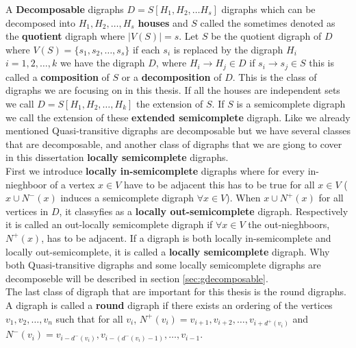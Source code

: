 A \textbf{Decomposable} digraphs $D=S[H_1,H_2,\dots H_s]$ digraphs which can be decomposed into $H_1,H_2, \dots , H_s$ \textbf{houses} and $S$ called the sometimes denoted as the \textbf{quotient} digraph where $|V(S)|=s$. 
Let $S$ be the quotient digraph of $D$ where $V(S)=\lbrace s_1,s_2,\dots,s_s\rbrace$ if each $s_i$ is replaced by the digraph $H_i$ $i=1,2,\dots,k$ we have the digraph $D$, where $H_i\rightarrow H_j \in D$ if $s_i\rightarrow s_j\in S$ this is called a \textbf{composition} of $S$ or a \textbf{decomposition} of $D$.
This is the class of digraphs we are focusing on in this thesis. 
If all the houses are independent sets we call $D=S[H_1,H_2,\dots ,H_k]$ the extension of $S$. 
If $S$ is a semicomplete digraph we call the extension of these \textbf{extended semicomplete} digraph.
Like we already mentioned Quasi-transitive digraphs are decomposable but we have several classes that are decomposable, and another class of digraphs that we are giong to cover in this dissertation \textbf{locally semicomplete} digraphs.\\
First we introduce \textbf{locally in-semicomplete} digraphs where for every in-nieghboor of a vertex $x\in V$ have to be adjacent this has to be true for all $x\in V$ ($x\cup N^-(x)$ induces a semicomplete digraph $\forall x\in V$). When $x\cup N^+(x)$ for all vertices in $D$, it classyfies as a \textbf{locally out-semicomplete} digraph. 
Respectively it is called an out-locally semicomplete digraph if $\forall x\in V$ the out-nieghboors, $N^+(x)$, has to be adjacent. 
If a digraph is both locally in-semicomplete and locally out-semicomplete, it is called a \textbf{locally semicomplete} digraph. 
Why both Quasi-transitive digraphs and some locally semicomplete digraphs are decomposeble will be described in section \autoref{sec:gdecomposable}.\\
The last class of digraph that are important for this thesis is the round digraphs. 
A digraph is called a \textbf{round} digraph if there exists an ordering of the vertices $v_1,v_2,\dots,v_n$ such that for all $v_i$, $N^+(v_i)={v_{i+1},v_{i+2},\dots ,v_{i+d^+(v_i)}}$ and $N^-(v_i)={v_{i-d^-(v_i)},v_{i-(d^-(v_i)-1)},\dots ,v_{i-1}}$.




